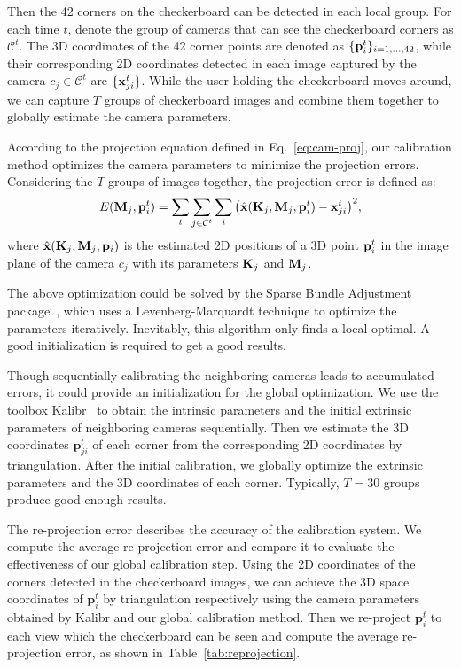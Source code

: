 %
Then the 42 corners on the checkerboard can be detected in each local group.
%
For each time $t$, denote the group of cameras that can see the checkerboard corners as $\mathcal{C}^t$. The 3D coordinates of the 42 corner points are denoted as $\{\mathbf{p}^{t}_{i}\}_{i=1,\ldots, 42}$, while their corresponding 2D coordinates detected in each image captured by the camera $c_j \in \mathcal{C}^{t}$ are $\{\mathbf{x}^{t}_{ji}\}$.
%
While the user holding the checkerboard moves around, we can capture $T$ groups of checkerboard images and combine them together to globally estimate the camera parameters.
%


According to the projection equation defined in Eq.~\ref{eq:cam-proj}, our calibration method optimizes the camera parameters to minimize the projection errors. Considering the $T$ groups of images together, the projection error is defined as:
%
\begin{equation} \label{eq:global-proj-error}
E(\mathbf{M}_{j},\mathbf{p}^{t}_{i})=\sum_{t}\sum_{j\in \mathcal{C}^{t}}\sum_{i} \big( \hat{\mathbf{x}}(\mathbf{K}_{j},\mathbf{M}_{j}, \mathbf{p}^{t}_{i})-\mathbf{x}^{t}_{ji} \big)^{2},
\end{equation}
%
where $\hat{\mathbf{x}}(\mathbf{K}_{j},\mathbf{M}_{j}, \mathbf{p}_{i})$ is the estimated 2D positions of a 3D point $\mathbf{p}^{t}_{i}$ in the image plane of the camera $c_j$ with its parameters $\mathbf{K}_j$ and $\mathbf{M}_j$.


The above optimization could be solved by the Sparse Bundle Adjustment package~\cite{lour09}, which uses a Levenberg-Marquardt technique to optimize the parameters iteratively.
Inevitably, this algorithm only finds a local optimal.
A good initialization is required to get a good results.


Though sequentially calibrating the neighboring cameras leads to accumulated errors, it could provide an initialization for the global optimization.
%
We use the toolbox Kalibr~\cite{Maye2013Self} to obtain the intrinsic parameters and the initial extrinsic parameters of neighboring cameras sequentially.
%
Then we estimate the 3D coordinates $\mathbf{p}^{t}_{ji}$ of each corner from the corresponding 2D coordinates by triangulation.
%
After the initial calibration, we globally optimize the extrinsic parameters and the 3D coordinates of each corner.
Typically, $T=30$ groups produce good enough results.

The re-projection error describes the accuracy of the calibration system.
We compute the average re-projection error and compare it to evaluate the effectiveness of our global calibration step.
%
Using the 2D coordinates of the corners detected in the checkerboard images, we can achieve the 3D space coordinates of $\mathbf{p}^{t}_{i}$ by triangulation respectively using the camera parameters obtained by Kalibr and our global calibration method.
Then we re-project $\mathbf{p}^{t}_{i}$ to each view which the checkerboard can be seen and compute the average re-projection error, as shown in Table~\ref{tab:reprojection}.


